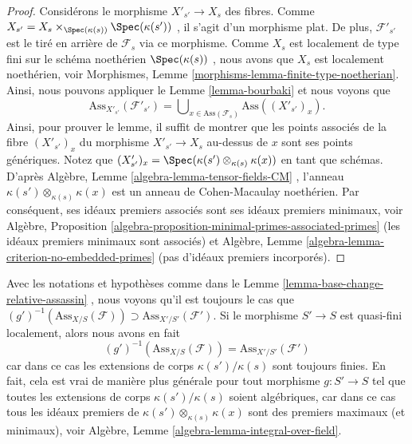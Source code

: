 \begin{proof}
Considérons le morphisme  $X'_{s'} \to X_s$  des fibres. Comme  $X_{s'} = X_s \times_{\Spec(\kappa(s))} \Spec(\kappa(s'))$ , il s'agit
d'un morphisme plat. De plus,  $\mathcal{F}'_{s'}$  est le tiré en arrière de  $\mathcal{F}_s$ 
via ce morphisme. Comme  $X_s$  est localement de type fini sur le schéma
noethérien  $\Spec(\kappa(s))$ , nous avons que  $X_s$  est localement noethérien,
voir Morphismes, Lemme  \ref{morphisms-lemma-finite-type-noetherian}. Ainsi, nous pouvons appliquer le Lemme
 \ref{lemma-bourbaki}  et nous voyons que
$$
\text{Ass}_{X'_{s'}}(\mathcal{F}'_{s'}) =
\bigcup\nolimits_{x \in \text{Ass}(\mathcal{F}_s)} \text{Ass}((X'_{s'})_x).
$$
Ainsi, pour prouver le lemme, il suffit de montrer que les points associés de la
fibre  $(X'_{s'})_x$  du morphisme  $X'_{s'} \to X_s$  au-dessus de  $x$  sont ses
points génériques. Notez que  $(X'_{s'})_x = \Spec(\kappa(s') \otimes_{\kappa(s)} \kappa(x))$  en tant que schémas. D'après Algèbre,
Lemme  \ref{algebra-lemma-tensor-fields-CM} , l'anneau  $\kappa(s') \otimes_{\kappa(s)} \kappa(x)$  est un anneau de Cohen-Macaulay
noethérien. Par conséquent, ses idéaux premiers associés sont ses idéaux premiers
minimaux, voir Algèbre, Proposition  \ref{algebra-proposition-minimal-primes-associated-primes}  (les idéaux premiers minimaux
sont associés) et Algèbre, Lemme  \ref{algebra-lemma-criterion-no-embedded-primes}  (pas d'idéaux premiers incorporés).
\end{proof}

\begin{remark}
\label{remark-base-change-relative-assassin}
Avec les notations et hypothèses comme dans le Lemme  \ref{lemma-base-change-relative-assassin} , nous voyons
qu'il est toujours le cas que  $(g')^{-1}(\text{Ass}_{X/S}(\mathcal{F})) \supset
\text{Ass}_{X'/S'}(\mathcal{F}')$. Si le morphisme  $S' \to S$  est
quasi-fini localement, alors nous avons en fait
$$
(g')^{-1}(\text{Ass}_{X/S}(\mathcal{F}))
=
\text{Ass}_{X'/S'}(\mathcal{F}')
$$
car dans ce cas les extensions de corps  $\kappa(s')/\kappa(s)$  sont toujours finies. En
fait, cela est vrai de manière plus générale pour tout morphisme  $g : S' \to S$  tel
que toutes les extensions de corps  $\kappa(s')/\kappa(s)$  soient algébriques, car dans ce
cas tous les idéaux premiers de  $\kappa(s') \otimes_{\kappa(s)} \kappa(x)$  sont des premiers maximaux (et
minimaux), voir Algèbre, Lemme  \ref{algebra-lemma-integral-over-field}.
\end{remark}




